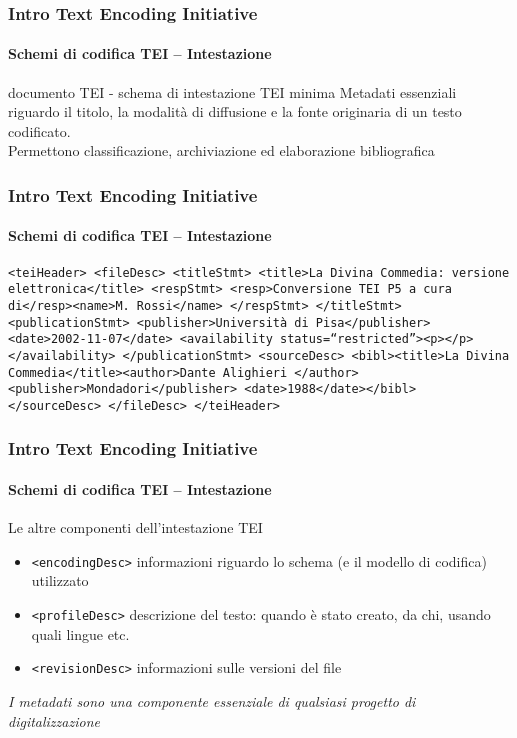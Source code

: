 \begin{frame}
	\frametitle{Intro Text Encoding Initiative}
	\framesubtitle{Schemi di codifica TEI – Intestazione}
	\addtocounter{nframe}{1}

	\begin{block}{documento TEI - schema di intestazione TEI minima}
        Metadati essenziali riguardo il titolo, la modalità di diffusione e
        la fonte originaria di un testo codificato.
        \\Permettono classificazione, archiviazione ed elaborazione
        bibliografica
    \end{block}
    
\end{frame}



\begin{frame}
	\frametitle{Intro Text Encoding Initiative}
	\framesubtitle{Schemi di codifica TEI – Intestazione}
	\addtocounter{nframe}{1}

        \texttt{<teiHeader>
        <fileDesc>
        <titleStmt>
        <title>La Divina Commedia: versione elettronica</title>
        <respStmt>
        <resp>Conversione TEI P5 a cura di</resp><name>M. Rossi</name>
        </respStmt>
        </titleStmt>
        <publicationStmt>
        <publisher>Università di Pisa</publisher>
        <date>2002-11-07</date>
        <availability status=``restricted''><p></p></availability>
        </publicationStmt>
        <sourceDesc>
        <bibl><title>La Divina Commedia</title><author>Dante Alighieri
        </author><publisher>Mondadori</publisher>
        <date>1988</date></bibl>
        </sourceDesc>
        </fileDesc>
        </teiHeader>}

\end{frame}



\begin{frame}
	\frametitle{Intro Text Encoding Initiative}
	\framesubtitle{Schemi di codifica TEI – Intestazione}
	\addtocounter{nframe}{1}

    \begin{block}{Le altre componenti dell’intestazione TEI}
        \begin{itemize}
            \item \texttt{<encodingDesc>} informazioni riguardo lo schema (e il
            modello di codifica) utilizzato
            \item  \texttt{<profileDesc>} descrizione del testo: quando è stato
            creato, da chi, usando quali lingue etc.
            \item \texttt{<revisionDesc>} informazioni sulle versioni del file
        \end{itemize}
    \end{block}
    \textit{I metadati sono una componente essenziale di qualsiasi
        progetto di digitalizzazione}
\end{frame}


